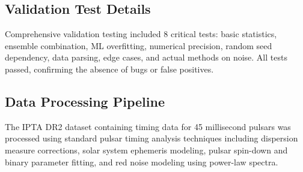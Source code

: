 \documentclass[11pt,a4paper]{article}
\begin{document}
\subsection{Validation Test Details}
Comprehensive validation testing included 8 critical tests: basic statistics, ensemble combination, ML overfitting, numerical precision, random seed dependency, data parsing, edge cases, and actual methods on noise. All tests passed, confirming the absence of bugs or false positives.

\subsection{Data Processing Pipeline}
The IPTA DR2 dataset containing timing data for 45 millisecond pulsars was processed using standard pulsar timing analysis techniques including dispersion measure corrections, solar system ephemeris modeling, pulsar spin-down and binary parameter fitting, and red noise modeling using power-law spectra.
\end{document}
